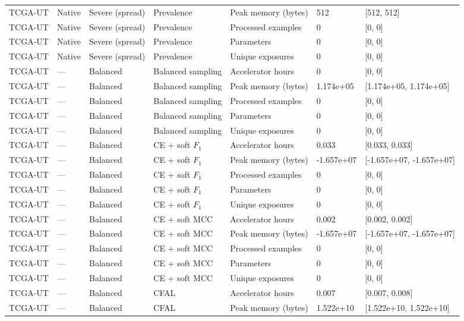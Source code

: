 \begin{longtable}{lllllll}
TCGA-UT & Native & Severe (spread) & Prevalence & Peak memory (bytes) & 512 & [512, 512] \\
TCGA-UT & Native & Severe (spread) & Prevalence & Processed examples & 0 & [0, 0] \\
TCGA-UT & Native & Severe (spread) & Prevalence & Parameters & 0 & [0, 0] \\
TCGA-UT & Native & Severe (spread) & Prevalence & Unique exposures & 0 & [0, 0] \\
TCGA-UT & --- & Balanced & Balanced sampling & Accelerator hours & 0 & [0, 0] \\
TCGA-UT & --- & Balanced & Balanced sampling & Peak memory (bytes) & 1.174e+05 & [1.174e+05, 1.174e+05] \\
TCGA-UT & --- & Balanced & Balanced sampling & Processed examples & 0 & [0, 0] \\
TCGA-UT & --- & Balanced & Balanced sampling & Parameters & 0 & [0, 0] \\
TCGA-UT & --- & Balanced & Balanced sampling & Unique exposures & 0 & [0, 0] \\
TCGA-UT & --- & Balanced & CE + soft $F_1$ & Accelerator hours & 0.033 & [0.033, 0.033] \\
TCGA-UT & --- & Balanced & CE + soft $F_1$ & Peak memory (bytes) & -1.657e+07 & [-1.657e+07, -1.657e+07] \\
TCGA-UT & --- & Balanced & CE + soft $F_1$ & Processed examples & 0 & [0, 0] \\
TCGA-UT & --- & Balanced & CE + soft $F_1$ & Parameters & 0 & [0, 0] \\
TCGA-UT & --- & Balanced & CE + soft $F_1$ & Unique exposures & 0 & [0, 0] \\
TCGA-UT & --- & Balanced & CE + soft MCC & Accelerator hours & 0.002 & [0.002, 0.002] \\
TCGA-UT & --- & Balanced & CE + soft MCC & Peak memory (bytes) & -1.657e+07 & [-1.657e+07, -1.657e+07] \\
TCGA-UT & --- & Balanced & CE + soft MCC & Processed examples & 0 & [0, 0] \\
TCGA-UT & --- & Balanced & CE + soft MCC & Parameters & 0 & [0, 0] \\
TCGA-UT & --- & Balanced & CE + soft MCC & Unique exposures & 0 & [0, 0] \\
TCGA-UT & --- & Balanced & CFAL & Accelerator hours & 0.007 & [0.007, 0.008] \\
TCGA-UT & --- & Balanced & CFAL & Peak memory (bytes) & 1.522e+10 & [1.522e+10, 1.522e+10] \\

\end{longtable}

